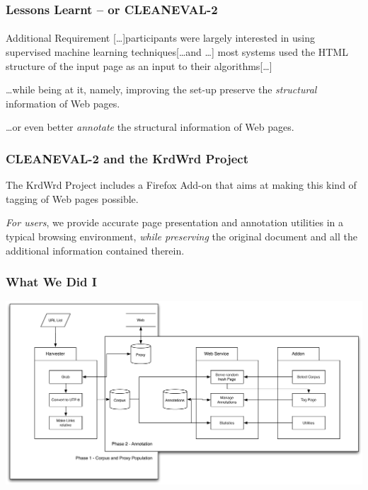 \documentclass{beamer}
\begin{document}
\begin{frame}
\frametitle{Lessons Learnt -- or CLEANEVAL-2}
\framesubtitle{\hfill {\tiny \cite{BaroniChantreeKilgarriffSharoff2008}}}

	\begin{block}{Additional Requirement}
		[\ldots]participants were largely interested in using supervised machine learning techniques[\ldots and \ldots] most systems used the HTML structure of the input page as an input to their algorithms[\ldots]
	\end{block}

\pause

	\begin{block}{\ldots while being at it, namely, improving the set-up}
		preserve the \textit{structural} information of Web pages. 
	\end{block}
	
\pause
	
	\begin{block}{\ldots or even better}
		\textit{annotate} the structural information of Web pages. 
	\end{block}

\end{frame}


\begin{frame}
\frametitle{CLEANEVAL-2 and the KrdWrd Project}

	\begin{block}{}
		The KrdWrd Project includes a Firefox Add-on that aims at making this kind of tagging of Web pages possible. 
		
		\textit{For users}, we provide accurate page presentation and annotation utilities in a typical browsing environment, \textit{while preserving} the original document and all the additional information contained therein.
	\end{block}
\end{frame}


\begin{frame}
\frametitle{What We Did I}

        \begin{center}
                \includegraphics[width=\textwidth]{20080703_pics/corpflow.pdf}
        \end{center}

\end{frame}
\end{document}
